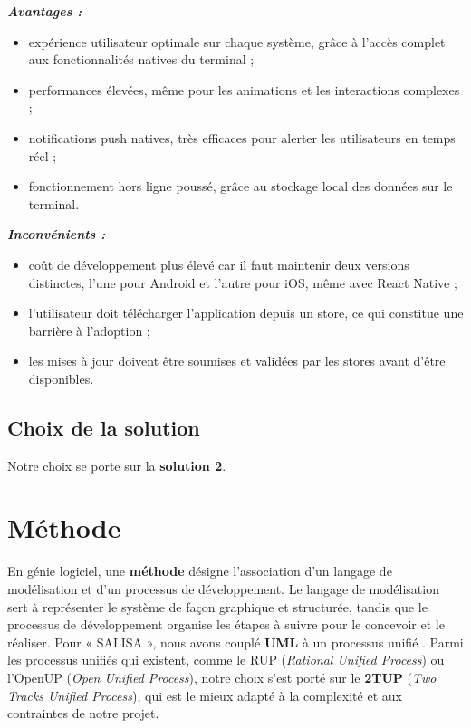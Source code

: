 \vspace{0.2cm}
\textit{\textbf{\textcolor{vertCongo}{Avantages :}}}
\begin{itemize}
	\item expérience utilisateur optimale sur chaque système, grâce à l'accès complet aux fonctionnalités natives du terminal ;
	\item performances élevées, même pour les animations et les interactions complexes ;
	\item notifications push natives, très efficaces pour alerter les utilisateurs en temps réel ;
	\item fonctionnement hors ligne poussé, grâce au stockage local des données sur le terminal.
\end{itemize}

\vspace{0.1cm}
\textit{\textbf{\textcolor{vertCongo}{Inconvénients :}}}
\begin{itemize}
	\item coût de développement plus élevé car il faut maintenir deux versions distinctes, l'une pour Android et l'autre pour iOS, même avec React Native ;
	\item l'utilisateur doit télécharger l'application depuis un store, ce qui constitue une barrière à l'adoption ;
	\item les mises à jour doivent être soumises et validées par les stores avant d'être disponibles.
\end{itemize}

\subsection{Choix de la solution}

Notre choix se porte sur la \textbf{solution 2}.

\section{Méthode}

En génie logiciel, une \textbf{méthode} désigne l'association d'un langage de modélisation et d'un processus de développement. Le langage de modélisation sert à représenter le système de façon graphique et structurée, tandis que le processus de développement organise les étapes à suivre pour le concevoir et le réaliser. Pour « SALISA », nous avons couplé \textbf{UML} à un processus unifié \cite{roques_uml}. Parmi les processus unifiés qui existent, comme le RUP (\textit{Rational Unified Process}) ou l'OpenUP (\textit{Open Unified Process}), notre choix s'est porté sur le \textbf{2TUP} (\textit{Two Tracks Unified Process}), qui est le mieux adapté à la complexité et aux contraintes de notre projet.

